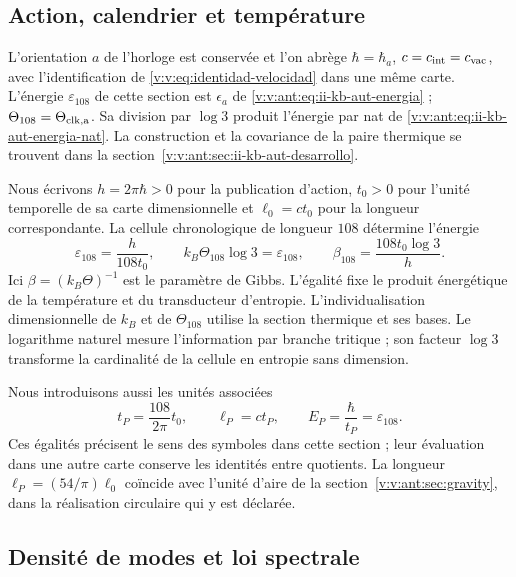 

\subsection{Action, calendrier et température}

L’orientation \(a\) de l’horloge est conservée et l’on abrège
\(\hbar=\hbar_a\), \(c=c_{\rm int}=c_{\rm vac}\), avec
l’identification de \eqref{v:v:eq:identidad-velocidad} dans une même carte.
L’énergie \(\varepsilon_{108}\) de cette section est
\(\epsilon_a\) de \eqref{v:v:ant:eq:ii-kb-aut-energia} ;
\(\Theta_{108}=\Theta_{\rm clk,a}\). Sa division par \(\log3\)
produit l’énergie par nat de \eqref{v:v:ant:eq:ii-kb-aut-energia-nat}.
La construction et la covariance de la paire thermique se trouvent dans
la section~\ref{v:v:ant:sec:ii-kb-aut-desarrollo}.

Nous écrivons \(h=2\pi\hbar>0\) pour la publication d’action, \(t_0>0\)
pour l’unité temporelle de sa carte dimensionnelle et \(\ell_0=ct_0\) pour
la longueur correspondante. La cellule chronologique de longueur \(108\)
détermine l’énergie
\begin{equation}
 \varepsilon_{108}=\frac{h}{108t_0},\qquad
 k_B\Theta_{108}\log 3=\varepsilon_{108},\qquad
 \beta_{108}=\frac{108t_0\log3}{h}.
 \label{v:v:eq:energia-informacion-calendario}
\end{equation}
Ici \(\beta=(k_B\Theta)^{-1}\) est le paramètre de Gibbs. L’égalité
fixe le produit énergétique de la température et du transducteur
d’entropie. L’individualisation dimensionnelle de \(k_B\) et de
\(\Theta_{108}\) utilise la section thermique et ses bases. Le logarithme
naturel mesure l’information par branche tritique ; son facteur \(\log3\) transforme
la cardinalité de la cellule en entropie sans dimension.

Nous introduisons aussi les unités associées
\begin{equation}
 t_P=\frac{108}{2\pi}t_0,\qquad
 \ell_P=ct_P,\qquad E_P=\frac{\hbar}{t_P}
 =\varepsilon_{108}.
 \label{v:v:eq:unidades-termicas-calendario}
\end{equation}
Ces égalités précisent le sens des symboles dans cette section ;
leur évaluation dans une autre carte conserve les identités entre quotients.
La longueur \(\ell_P=(54/\pi)\ell_0\) coïncide avec l’unité d’aire
de la section~\ref{v:v:ant:sec:gravity}, dans la réalisation circulaire qui y est
déclarée.

\subsection{Densité de modes et loi spectrale}

